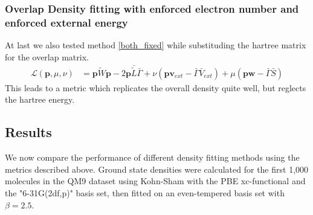 \subsubsection{Overlap Density fitting with enforced electron number and enforced external energy}
At last we also tested method \ref{both_fixed} while substituding the hartree matrix for the overlap matrix.
\begin{align}
    \mathcal{L}(\mathbf{p},\mu,\nu) &= \mathbf{p} \tilde{W} \mathbf{p} - 2 \mathbf{p}\bar {\tilde L} \bar\Gamma + \nu(\mathbf{p}\mathbf{v}_{ext}-\bar\Gamma \bar{V}_{ext})+\mu(\mathbf{p}\mathbf{w}-\bar\Gamma\bar S)
\end{align}
This leads to a metric which replicates the overall density quite well, but reglects the hartree energy.
\subsection{Results}
We now compare the performance of different density fitting methods using the metrics described above. Ground state densities were calculated for the first 1,000 molecules in the QM9 dataset using Kohn-Sham with the PBE xc-functional and the "6-31G(2df,p)" basis set, then fitted on an even-tempered basis set with $\beta = 2.5$.

